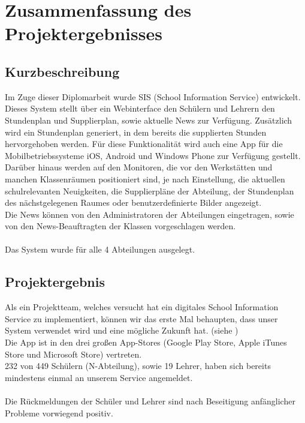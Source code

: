 \chapter[Zusammenfassung]{Zusammenfassung des \\Projektergebnisses}

\section{Kurzbeschreibung}
Im Zuge dieser Diplomarbeit wurde SIS (School Information Service) entwickelt. \\
Dieses System stellt über ein Webinterface den Schülern und Lehrern den Stundenplan und Supplierplan, sowie aktuelle News zur Verfügung. Zusätzlich wird ein Stundenplan generiert, in dem bereits die supplierten Stunden hervorgehoben werden.
Für diese Funktionalität wird auch eine App für die Mobilbetriebssysteme iOS, Android und Windows Phone zur Verfügung gestellt.\\
Darüber hinaus werden auf den Monitoren, die vor den Werkstätten und manchen Klassenräumen positioniert sind, je nach Einstellung, die aktuellen schulrelevanten Neuigkeiten, die Supplierpläne der Abteilung, der Stundenplan des nächstgelegenen Raumes oder benutzerdefinierte Bilder angezeigt.\\
Die News können von den Administratoren der Abteilungen eingetragen, sowie von den News-Beauftragten der Klassen vorgeschlagen werden.\\
\\
Das System wurde für alle 4 Abteilungen ausgelegt.

\section{Projektergebnis}
Als ein Projektteam, welches versucht hat ein digitales School Information Service zu implementiert, können wir das erste Mal behaupten, dass unser System verwendet wird und eine mögliche Zukunft hat. (siehe )\\
Die App ist in den drei großen App-Stores (Google Play Store, Apple iTunes Store und Microsoft Store) vertreten.\\
232 von 449 Schülern (N-Abteilung), sowie 19 Lehrer, haben sich bereits mindestens einmal an unserem Service angemeldet. \\
\\
Die Rückmeldungen der Schüler und Lehrer sind nach Beseitigung anfänglicher Probleme vorwiegend positiv.

